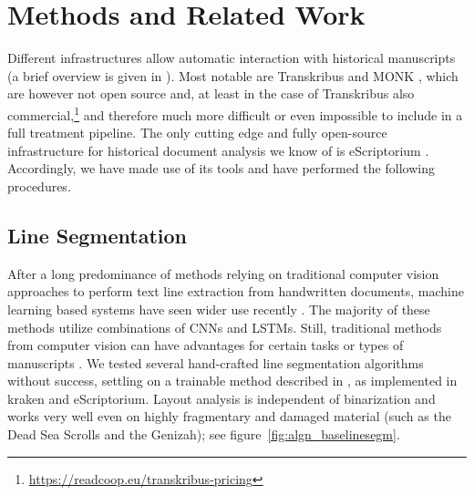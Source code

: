 \section{Methods and Related Work}

Different infrastructures allow automatic interaction with historical
manuscripts (a brief overview is given in \cite{KiesslingEtAl2019eScrip}).
Most notable are Transkribus \cite{Kahle} and MONK
\cite{schomaker2019lifelong}, which are however not open source and, at least
in the case of Transkribus also
commercial,\footnote{\url{https://readcoop.eu/transkribus-pricing}} and
therefore much more difficult or even impossible to include in a full treatment
pipeline.  The only cutting edge and fully open-source infrastructure for
historical document analysis we know of is eScriptorium \cite{escript19}.%
Accordingly, we have made use of its tools and have performed the following
procedures.

\subsection{Line Segmentation} After a long predominance of methods relying on
traditional computer vision approaches to perform text line extraction from
handwritten documents, machine learning based systems have seen wider use
recently
\cite{kiessling2019badam,gruning2018read,fink2018baseline,diem2017cbad,KurarBarakat2018}.
The majority of these methods utilize combinations of CNNs and LSTMs. Still,
traditional methods from computer vision can have advantages for certain tasks
or types of manuscripts \cite{Viral,Seuret,StoeklLapinForthcoming}.  We tested
several hand-crafted line segmentation algorithms without success, settling on
a trainable method described in \cite{kiessling2019badam,
KiesslingStoekl2019}, as implemented in kraken \cite{kiessling2019kraken} and
eScriptorium.  Layout analysis is independent of binarization and works very
well even on highly fragmentary and damaged material (such as the Dead Sea
Scrolls and the Genizah); see figure~\ref{fig:algn_baselinesegm}.

